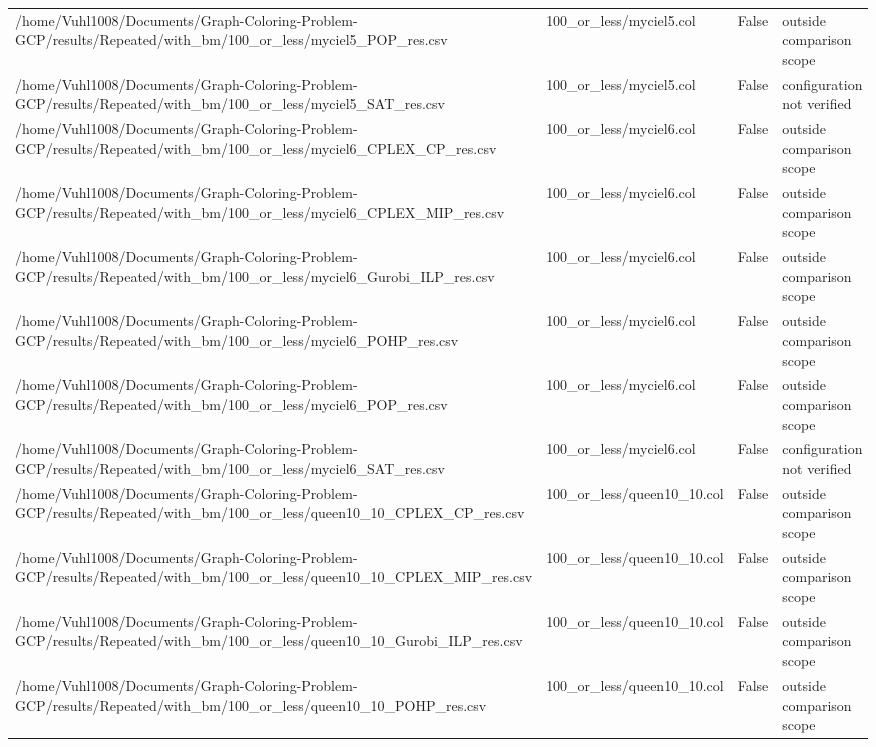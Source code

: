 \begin{table}[htbp]
\begin{tabular}{llll}
/home/Vuhl1008/Documents/Graph-Coloring-Problem-GCP/results/Repeated/with\_bm/100\_or\_less/myciel5\_POP\_res.csv & 100\_or\_less/myciel5.col & False & outside comparison scope \\
/home/Vuhl1008/Documents/Graph-Coloring-Problem-GCP/results/Repeated/with\_bm/100\_or\_less/myciel5\_SAT\_res.csv & 100\_or\_less/myciel5.col & False & configuration not verified \\
/home/Vuhl1008/Documents/Graph-Coloring-Problem-GCP/results/Repeated/with\_bm/100\_or\_less/myciel6\_CPLEX\_CP\_res.csv & 100\_or\_less/myciel6.col & False & outside comparison scope \\
/home/Vuhl1008/Documents/Graph-Coloring-Problem-GCP/results/Repeated/with\_bm/100\_or\_less/myciel6\_CPLEX\_MIP\_res.csv & 100\_or\_less/myciel6.col & False & outside comparison scope \\
/home/Vuhl1008/Documents/Graph-Coloring-Problem-GCP/results/Repeated/with\_bm/100\_or\_less/myciel6\_Gurobi\_ILP\_res.csv & 100\_or\_less/myciel6.col & False & outside comparison scope \\
/home/Vuhl1008/Documents/Graph-Coloring-Problem-GCP/results/Repeated/with\_bm/100\_or\_less/myciel6\_POHP\_res.csv & 100\_or\_less/myciel6.col & False & outside comparison scope \\
/home/Vuhl1008/Documents/Graph-Coloring-Problem-GCP/results/Repeated/with\_bm/100\_or\_less/myciel6\_POP\_res.csv & 100\_or\_less/myciel6.col & False & outside comparison scope \\
/home/Vuhl1008/Documents/Graph-Coloring-Problem-GCP/results/Repeated/with\_bm/100\_or\_less/myciel6\_SAT\_res.csv & 100\_or\_less/myciel6.col & False & configuration not verified \\
/home/Vuhl1008/Documents/Graph-Coloring-Problem-GCP/results/Repeated/with\_bm/100\_or\_less/queen10\_10\_CPLEX\_CP\_res.csv & 100\_or\_less/queen10\_10.col & False & outside comparison scope \\
/home/Vuhl1008/Documents/Graph-Coloring-Problem-GCP/results/Repeated/with\_bm/100\_or\_less/queen10\_10\_CPLEX\_MIP\_res.csv & 100\_or\_less/queen10\_10.col & False & outside comparison scope \\
/home/Vuhl1008/Documents/Graph-Coloring-Problem-GCP/results/Repeated/with\_bm/100\_or\_less/queen10\_10\_Gurobi\_ILP\_res.csv & 100\_or\_less/queen10\_10.col & False & outside comparison scope \\
/home/Vuhl1008/Documents/Graph-Coloring-Problem-GCP/results/Repeated/with\_bm/100\_or\_less/queen10\_10\_POHP\_res.csv & 100\_or\_less/queen10\_10.col & False & outside comparison scope \\

\end{tabular}
\end{table}
